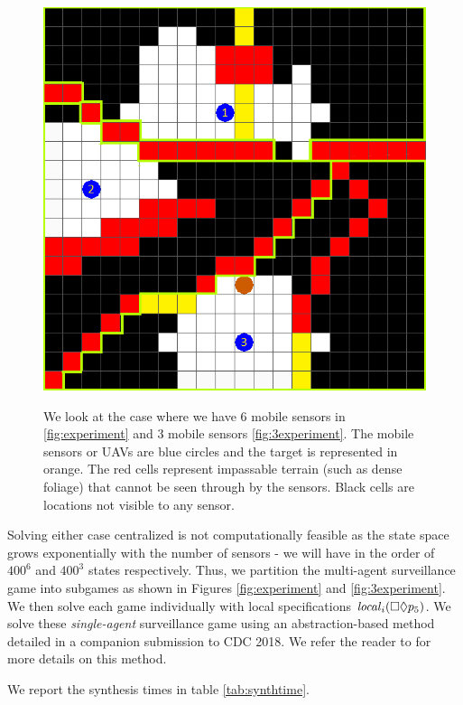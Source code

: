 \begin{figure}
{\includegraphics[scale=0.14]{figs/SGR-grid-vis-part_3.png}
\hspace{.3cm}}

\caption{We look at the case where we have 6 mobile sensors in \ref{fig:experiment} and 3 mobile sensors \ref{fig:3experiment}\label{fig:bigexp}. The mobile sensors or UAVs are blue circles and the target is represented in orange. The red cells represent impassable terrain (such as dense foliage) that cannot be seen through by the sensors. Black cells are locations not visible to any sensor.}\vspace{-0.5cm}
\end{figure} 

Solving either case centralized is not computationally feasible as the state space grows exponentially with the number of sensors - we will have in the order of $400^6$ and $400^3$ states respectively. Thus, we partition the multi-agent surveillance game into subgames as shown in Figures \ref{fig:experiment} and \ref{fig:3experiment}. We then solve each game individually with local specifications $\mathit{local}_i(\square \lozenge p_5)$. We solve these \emph{single-agent} surveillance game using an abstraction-based method detailed in a companion submission to CDC 2018. We refer the reader to \cite{arxiv} for more details on this method. 

We report the synthesis times in table \ref{tab:synthtime}.

